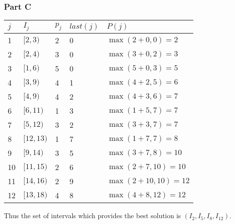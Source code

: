 \documentclass[12pt]{article}
\begin{document}
\subsubsection*{Part C}
\begin{table}[ht]
\centering
  \begin{tabular}{l|llll}
  $j$ & $I_j$      & $p_j$ & $last(j)$ & $P(j)$                  \\ \hline
  1   & $[2, 3)$   & 2     & 0         & $\max(2 + 0, 0) = 2$    \\
  2   & $[2, 4)$   & 3     & 0         & $\max(3 + 0, 2) = 3$    \\
  3   & $[1, 6)$   & 5     & 0         & $\max(5 + 0, 3) = 5$    \\
  4   & $[3, 9)$   & 4     & 1         & $\max(4 + 2, 5) = 6$    \\
  5   & $[4, 9)$   & 4     & 2         & $\max(4 + 3, 6) = 7$    \\
  6   & $[6, 11)$  & 1     & 3         & $\max(1 + 5, 7) = 7$    \\
  7   & $[5, 12)$  & 3     & 2         & $\max(3 + 3, 7) = 7$    \\
  8   & $[12, 13)$ & 1     & 7         & $\max(1 + 7, 7) = 8$    \\
  9   & $[9, 14)$  & 3     & 5         & $\max(3 + 7, 8) = 10$   \\
  10  & $[11, 15)$ & 2     & 6         & $\max(2 + 7, 10) = 10$  \\
  11  & $[14, 16)$ & 2     & 9         & $\max(2 + 10, 10) = 12$ \\
  12  & $[13, 18)$ & 4     & 8         & $\max(4 + 8, 12) = 12$  \\
  \end{tabular}
\end{table}

Thus the set of intervals which provides the best solution is $(I_2, I_5, I_8, I_{12})$.
\end{document}
